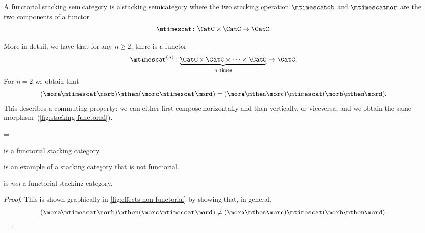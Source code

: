 \begin{ctdefinition}
	\label{def:functorial-stacking-semi-cat}
	A functorial stacking semicategory is a stacking semicategory where the two stacking operation $\mtimescatob$ and $\mtimescatmor$ are the two components of a functor
	\begin{equation}
		\mtimescat\colon \CatC \times \CatC \to \CatC.
	\end{equation}
\end{ctdefinition}

More in detail, we have that for any $n \geq 2$, there is a functor
%
\begin{equation}
	\mtimescat^{(n)}: \underbrace {\CatC \times \CatC \times \cdots \times \CatC}_{\text{$n$ times}} \to \CatC.
\end{equation}
%
For $n=2$ we obtain that
%
\begin{equation}
	(\mora \mtimescat \morb )
	\mthen (\morc \mtimescat \mord )
	=
	(\mora \mthen \morc ) \mtimescat (\morb \mthen \mord ).
\end{equation}
%
This describes a commuting property: we can either first compose horizontally and then vertically, or viceversa, and we obtain the same morphism~(\cref{fig:stacking-functorial}).

\begin{figure*}[h]
	\centering
	=
	\caption{Commutation of stacking and composition in a functorial stacking semicategory. }
	\label{fig:stacking-functorial}
\end{figure*}

\begin{lemma}
	\SetL is a functorial stacking category.
\end{lemma}

\Effects is an example of a stacking category that is not functorial.

\begin{lemma}
	\Effects is \emph{not} a functorial stacking category.
\end{lemma}

\begin{proof}
	This is shown graphically in \cref{fig:effects-non-functorial} by showing that, in general,
	\begin{equation}
		(\mora \mtimescat \morb )
		\mthen (\morc \mtimescat \mord )
		\neq
		(\mora \mthen \morc ) \mtimescat (\morb \mthen \mord ).
	\end{equation}
\end{proof}

